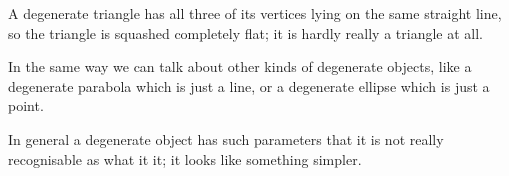 A degenerate triangle has all three of its vertices lying on the
same straight line, so the triangle is squashed completely flat;
it is hardly really a triangle at all.
\par
In the same way we can talk about other kinds of degenerate objects,
like a degenerate parabola which is just a line, or a degenerate
ellipse which is just a point.
\par
In general a degenerate object has such parameters that it is not
really recognisable as what it it; it looks like something simpler.